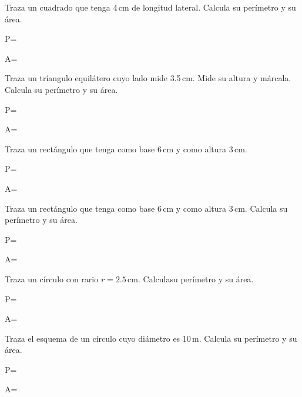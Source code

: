 \documentclass[11pt]{article}
\begin{document}
\begin{multicols}{2}
    
Traza un cuadrado que tenga 4\,cm de longitud lateral. Calcula su per\'imetro y
su \'area.

\vspace{5cm}
P=

A=

\vspace{1cm}

Traza un tr\'iangulo equil\'atero cuyo lado mide 3.5\,cm. Mide su altura y
m\'arcala. Calcula su per\'imetro y su \'area.

\vspace{5cm}
P=

A=

\vspace{1cm}

Traza un rect\'angulo que tenga como base 6\,cm y como altura 3\,cm.

\vspace{5cm}
P=

A=

\vspace{1cm}

Traza un rect\'angulo que tenga como base 6\,cm y como altura 3\,cm. Calcula su
per\'imetro y su \'area.

\vspace{5cm}
P=

A=

\vspace{1cm}

\end{multicols}
\begin{multicols}{2}

Traza un c\'irculo con rario $r=2.5$\,cm. Calculasu per\'imetro y su \'area.
\vspace{5cm}

P=

A=

\vspace{1cm}

Traza el esquema de un c\'irculo cuyo di\'ametro es 10\,m. Calcula su
per\'imetro y su \'area.

\vspace{5cm}
P=

A=

\vspace{1cm}

\end{multicols}
\end{document}
